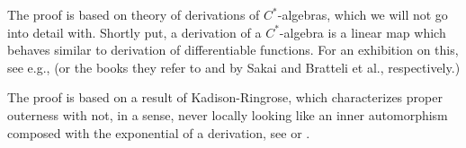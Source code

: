 \begin{remark}
	The proof is based on theory of derivations of $C^*$-algebras, which we will not go into detail with. Shortly put, a derivation of a $C^*$-algebra is a linear map which behaves similar to derivation of differentiable functions. For an exhibition on this, see e.g., \cite[Chapter 8.6]{pedersenalgauto} (or the books they refer to \cite{sakai1978recent} and \cite{bratteli2012operator} by Sakai and Bratteli et al., respectively.) 

	The proof is based on a result of Kadison-Ringrose, which characterizes proper outerness with not, in a sense, never locally looking like an inner automorphism composed with the exponential of a derivation, see \cite{kadison1967derivations} or \cite[Theorem 6.6 (i) and (ii)]{olesenpedersen3}.
\end{remark}


